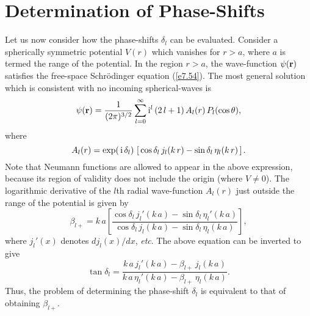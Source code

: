\section{Determination of Phase-Shifts}
Let us now consider how the phase-shifts $\delta_l$ can be
 evaluated. Consider a spherically symmetric potential $V(r)$ which
vanishes for $r>a$, where $a$ is termed the range of the potential.
In the region $r>a$, the wave-function $\psi({\bf r})$ 
satisfies the free-space Schr\"{o}dinger equation (\ref{e7.54}). The
most general solution which is consistent with no incoming spherical-waves is
\begin{equation}
\psi({\bf r}) = \frac{1}{(2\pi)^{3/2}} \sum_{l=0}^\infty
{\rm i}^l\, (2\,l+1) \, A_l(r)\, P_l(\cos\theta),
\end{equation}
where
\begin{equation}\label{e7.80}
A_l(r) = \exp(\,{\rm i} \,\delta_l)\,
\left[ \,\cos\delta_l \,j_l(k\,r) -\sin\delta_l\, \eta_l(k\,r)\,\right].
\end{equation}
Note that  Neumann functions are allowed to appear in the above
expression, because its region of validity does not include the origin
(where $V\neq 0$). The logarithmic derivative of the $l$th 
radial wave-function
$A_l(r)$ just outside the range of the potential is given by
\begin{equation}
\beta_{l+} = k\,a \left[\frac{ \cos\delta_l\,j_l'(k\,a) -
\sin\delta_l\, \eta_l'(k\,a)}{\cos\delta_l \,
j_l(k\,a) - \sin\delta_l\,\eta_l(k\,a)}\right],
\end{equation}
where $j_l'(x)$ denotes $dj_l(x)/dx$, {\em etc}. The above equation
can be inverted to give
\begin{equation}\label{e7.82}
\tan \delta_l = \frac{ k\,a\,j_l'(k\,a) - \beta_{l+}\, j_l(k\,a)}
{k\,a\,\eta_l'(k\,a) - \beta_{l+}\, \eta_l(k\,a)}.
\end{equation}
Thus, the problem of determining the phase-shift $\delta_l$ is equivalent
to that of obtaining $\beta_{l+}$. 

